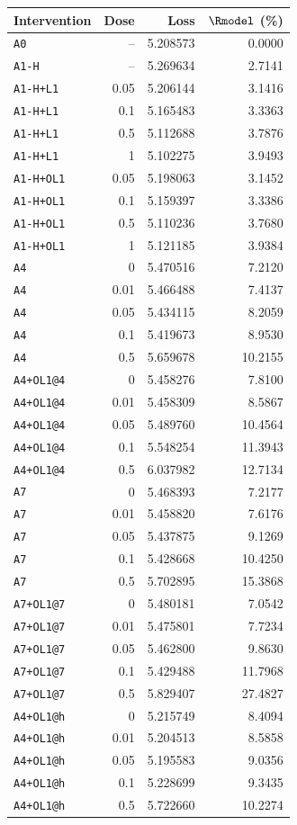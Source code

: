 \begin{tabular}{lrrr}
\toprule
Intervention & Dose & Loss & $\Rmodel$ (\%) \\
\midrule
\texttt{A0} & -- & 5.208573 & 0.0000 \\
\texttt{A1-H} & -- & 5.269634 & 2.7141 \\
\texttt{A1-H+L1} & 0.05 & 5.206144 & 3.1416 \\
\texttt{A1-H+L1} & 0.1 & 5.165483 & 3.3363 \\
\texttt{A1-H+L1} & 0.5 & 5.112688 & 3.7876 \\
\texttt{A1-H+L1} & 1 & 5.102275 & 3.9493 \\
\texttt{A1-H+OL1} & 0.05 & 5.198063 & 3.1452 \\
\texttt{A1-H+OL1} & 0.1 & 5.159397 & 3.3386 \\
\texttt{A1-H+OL1} & 0.5 & 5.110236 & 3.7680 \\
\texttt{A1-H+OL1} & 1 & 5.121185 & 3.9384 \\
\texttt{A4} & 0 & 5.470516 & 7.2120 \\
\texttt{A4} & 0.01 & 5.466488 & 7.4137 \\
\texttt{A4} & 0.05 & 5.434115 & 8.2059 \\
\texttt{A4} & 0.1 & 5.419673 & 8.9530 \\
\texttt{A4} & 0.5 & 5.659678 & 10.2155 \\
\texttt{A4+OL1@4} & 0 & 5.458276 & 7.8100 \\
\texttt{A4+OL1@4} & 0.01 & 5.458309 & 8.5867 \\
\texttt{A4+OL1@4} & 0.05 & 5.489760 & 10.4564 \\
\texttt{A4+OL1@4} & 0.1 & 5.548254 & 11.3943 \\
\texttt{A4+OL1@4} & 0.5 & 6.037982 & 12.7134 \\
\texttt{A7} & 0 & 5.468393 & 7.2177 \\
\texttt{A7} & 0.01 & 5.458820 & 7.6176 \\
\texttt{A7} & 0.05 & 5.437875 & 9.1269 \\
\texttt{A7} & 0.1 & 5.428668 & 10.4250 \\
\texttt{A7} & 0.5 & 5.702895 & 15.3868 \\
\texttt{A7+OL1@7} & 0 & 5.480181 & 7.0542 \\
\texttt{A7+OL1@7} & 0.01 & 5.475801 & 7.7234 \\
\texttt{A7+OL1@7} & 0.05 & 5.462800 & 9.8630 \\
\texttt{A7+OL1@7} & 0.1 & 5.429488 & 11.7968 \\
\texttt{A7+OL1@7} & 0.5 & 5.829407 & 27.4827 \\
\texttt{A4+OL1@h} & 0 & 5.215749 & 8.4094 \\
\texttt{A4+OL1@h} & 0.01 & 5.204513 & 8.5858 \\
\texttt{A4+OL1@h} & 0.05 & 5.195583 & 9.0356 \\
\texttt{A4+OL1@h} & 0.1 & 5.228699 & 9.3435 \\
\texttt{A4+OL1@h} & 0.5 & 5.722660 & 10.2274 \\
\bottomrule
\end{tabular}

